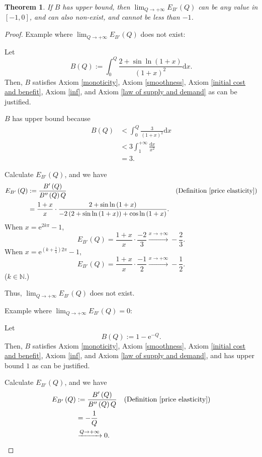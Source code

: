 \documentclass{article}
\newtheorem{theorem}{Theorem}[subsection]
\begin{document}
\begin{theorem}
If $B$ has upper bound, then $\lim_{Q\to+\infty}E_{B'}\left(Q\right)$ can be any value in $\left[-1,0\right]$, and can also non-exist, and cannot be less than $-1$.
\end{theorem}
\begin{proof}
Example where $\lim_{Q\to+\infty}E_{B'}\left(Q\right)$ does not exist:

Let
$$B\left(Q\right):=\int_0^Q\frac{2+\sin\ln\left(1+x\right)}{\left(1+x\right)^2}\mathrm dx.$$
Then, $B$ satisfies Axiom \ref{monoticity}, Axiom \ref{smoothness}, Axiom \ref{initial cost and benefit}, Axiom \ref{inf}, and Axiom \ref{law of supply and demand} as can be justified.

$B$ has upper bound because
\begin{align*}
B\left(Q\right)&<\int_0^Q\frac3{\left(1+x\right)^2}\mathrm dx\\
&<3\int_1^{+\infty}\frac{\mathrm dx}{x^2}\\
&=3.
\end{align*}

Calculate $E_{B'}\left(Q\right)$, and we have
\begin{align*}
E_{B'}\left(Q\right)&:=\frac{B'\left(Q\right)}{B''\left(Q\right)Q}&&\text{(Definition \ref{price elasticity})}\\
&=\frac{1+x}x\cdot\frac{2+\sin\ln\left(1+x\right)}{-2\left(2+\sin\ln\left(1+x\right)\right)+\cos\ln\left(1+x\right)}.
\end{align*}
When $x=\mathrm e^{2k\pi}-1$,
$$E_{B'}\left(Q\right)=\frac{1+x}x\cdot\frac{-2}3\xrightarrow{x\to+\infty}-\frac23.$$
When $x=\mathrm e^{\left(k+\frac14\right)2\pi}-1$,
$$E_{B'}\left(Q\right)=\frac{1+x}x\cdot\frac{-1}2\xrightarrow{x\to+\infty}-\frac12.$$
($k\in\mathbb N$.)

Thus, $\lim_{Q\to+\infty}E_{B'}\left(Q\right)$ does not exist.

Example where $\lim_{Q\to+\infty}E_{B'}\left(Q\right)=0$:

Let
$$B\left(Q\right):=1-\mathrm e^{-Q}.$$
Then, $B$ satisfies Axiom \ref{monoticity}, Axiom \ref{smoothness}, Axiom \ref{initial cost and benefit}, Axiom \ref{inf}, and Axiom \ref{law of supply and demand}, and has upper bound $1$ as can be justified.

Calculate $E_{B'}\left(Q\right)$, and we have
\begin{align*}
E_{B'}\left(Q\right)&:=\frac{B'\left(Q\right)}{B''\left(Q\right)Q}&&\text{(Definition \ref{price elasticity})}\\
&=-\frac1Q\\
&\xrightarrow{Q\to+\infty}0.
\end{align*}


\end{proof}
\end{document}

